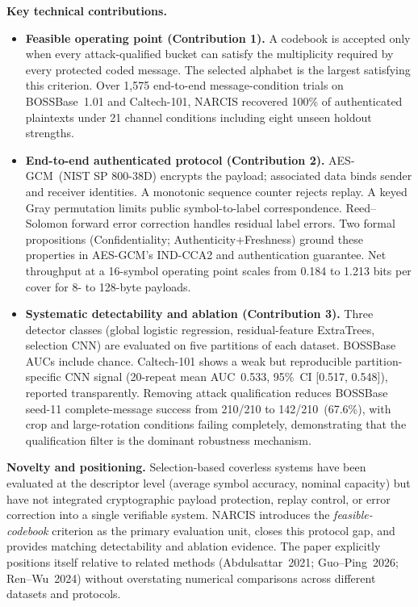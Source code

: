 \documentclass[10pt,letterpaper]{article}
\newcommand{\clhead}[1]{\textcolor{ieeeblue}{\textbf{#1}}}
\begin{document}
\clhead{Key technical contributions.}
\begin{itemize}
\item \textbf{Feasible operating point (Contribution 1).} A codebook is
  accepted only when every attack-qualified bucket can satisfy the
  multiplicity required by every protected coded message. The selected
  alphabet is the largest satisfying this criterion. Over 1{,}575
  end-to-end message-condition trials on BOSSBase~1.01 and Caltech-101,
  NARCIS recovered 100\% of authenticated plaintexts under 21 channel
  conditions including eight unseen holdout strengths.
\item \textbf{End-to-end authenticated protocol (Contribution 2).}
  AES-GCM~(NIST SP 800-38D) encrypts the payload; associated data binds
  sender and receiver identities. A monotonic sequence counter rejects
  replay. A keyed Gray permutation limits public symbol-to-label
  correspondence. Reed--Solomon forward error correction handles residual
  label errors. Two formal propositions (Confidentiality;
  Authenticity+Freshness) ground these properties in AES-GCM's
  IND-CCA2 and authentication guarantee. Net throughput at a 16-symbol
  operating point scales from 0.184 to 1.213 bits per cover for
  8- to 128-byte payloads.
\item \textbf{Systematic detectability and ablation (Contribution 3).}
  Three detector classes (global logistic regression, residual-feature
  ExtraTrees, selection CNN) are evaluated on five partitions of each
  dataset. BOSSBase AUCs include chance. Caltech-101 shows a weak but
  reproducible partition-specific CNN signal (20-repeat mean AUC~0.533,
  95\%~CI [0.517, 0.548]), reported transparently. Removing attack
  qualification reduces BOSSBase seed-11 complete-message success from
  210/210 to 142/210~(67.6\%), with crop and large-rotation conditions
  failing completely, demonstrating that the qualification filter is the
  dominant robustness mechanism.
\end{itemize}

\clhead{Novelty and positioning.}
Selection-based coverless systems have been evaluated at the
descriptor level (average symbol accuracy, nominal capacity) but have
not integrated cryptographic payload protection, replay control, or
error correction into a single verifiable system. NARCIS introduces the
\emph{feasible-codebook} criterion as the primary evaluation unit, closes
this protocol gap, and provides matching detectability and ablation
evidence. The paper explicitly positions itself relative to related
methods (Abdulsattar~2021; Guo--Ping~2026; Ren--Wu~2024) without
overstating numerical comparisons across different datasets and protocols.
\end{document}
